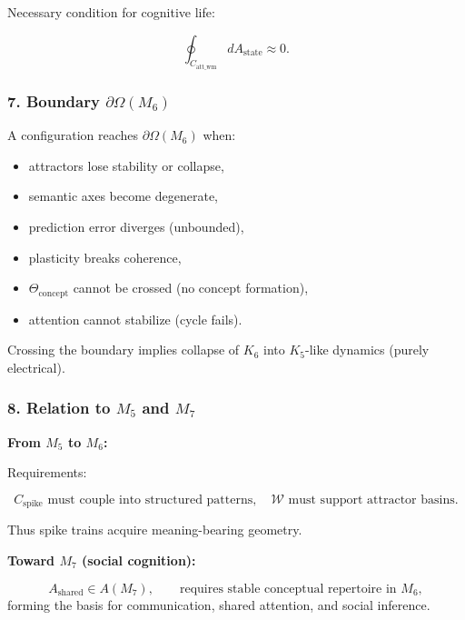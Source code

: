 Necessary condition for cognitive life:

\[
\oint_{C_{\mathrm{att\_wm}}} dA_{\mathrm{state}} \approx 0.
\]

\subsubsection*{7. Boundary \texorpdfstring{$\partial\Omega(M_6)$}{\partial\Omega(M_6)}}

A configuration reaches $\partial\Omega(M_6)$ when:

\begin{itemize}
    \item attractors lose stability or collapse,
    \item semantic axes become degenerate,
    \item prediction error diverges (unbounded),
    \item plasticity breaks coherence,
    \item $\Theta_{\mathrm{concept}}$ cannot be crossed (no concept formation),
    \item attention cannot stabilize (cycle fails).
\end{itemize}

Crossing the boundary implies collapse of $K_6$ into $K_5$-like dynamics (purely electrical).

\subsubsection*{8. Relation to \texorpdfstring{$M_5$}{M_5} and \texorpdfstring{$M_7$}{M_7}}

\textbf{From $M_5$ to $M_6$:}

Requirements:

\[
C_{\mathrm{spike}} \text{ must couple into structured patterns},
\quad
\mathcal{W} \text{ must support attractor basins}.
\]

Thus spike trains acquire meaning-bearing geometry.

\textbf{Toward $M_7$ (social cognition):}

\[
A_{\mathrm{shared}} \in A(M_7),
\qquad
\text{requires stable conceptual repertoire in } M_6,
\]
forming the basis for communication, shared attention, and social inference.
